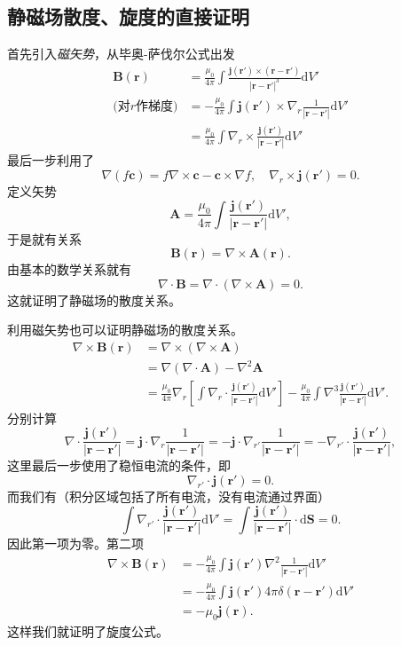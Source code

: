 \documentclass[UTF8]{ctexbook}
\renewcommand{\d}{\mathrm{d}}
\renewcommand{\b}{\boldsymbol}
\numberwithin{equation}{chapter}
\begin{document}
	\subsection{静磁场散度、旋度的直接证明}
	首先引入\emph{磁矢势}，从毕奥-萨伐尔公式出发
	\begin{align*}
		\b{B}(\b{r})&=\frac{\mu_0}{4\pi}\int\frac{\b{j}(\b{r}')\times(\b{r}-\b{r}')}{|\b{r}-\b{r}'|^3}\d V' \\
	\text{(对$r$作梯度)}	&=-\frac{\mu_0}{4\pi}\int\b{j}(\b{r}')\times\nabla_r\frac{1}{|\b{r}-\b{r}'|}\d V' \\	&=\frac{\mu_0}{4\pi}\int\nabla_r\times\frac{\b{j}(\b{r}')}{|\b{r}-\b{r}'|}\d V'
	\end{align*}
	最后一步利用了
	\[\nabla(f\b{c})=f\nabla\times\b{c}-\b{c}\times\nabla f,\quad \nabla_r\times\b{j}(\b{r}')=0.\]
	定义矢势
	\[\b{A}=\frac{\mu_0}{4\pi}\int\frac{\b{j}(\b{r}')}{|\b{r}-\b{r}'|}\d V',\]
	于是就有关系
	\[\b{B}(\b{r})=\nabla\times\b{A}(\b{r}).\]
	由基本的数学关系就有
	\[\nabla\cdot\b{B}=\nabla\cdot(\nabla\times\b{A})=0.\]
	这就证明了静磁场的散度关系。
	
	利用磁矢势也可以证明静磁场的散度关系。
	\begin{align*}
		\nabla\times\b{B}(\b{r})&=\nabla\times(\nabla\times\b{A}) \\ 
		&=\nabla(\nabla\cdot\b{A})-\nabla^2\b{A} \\
		&=\frac{\mu_0}{4\pi}\nabla_r \left[\int\nabla_r\cdot\frac{\b{j}(\b{r}')}{|\b{r}-\b{r}'|}\d V'\right] -\frac{\mu_0}{4\pi}\int\nabla^3\frac{\b{j}(\b{r}')}{|\b{r}-\b{r}'|}\d V'.
	\end{align*}
	分别计算
	\[\nabla\cdot\frac{\b{j}(\b{r}')}{|\b{r}-\b{r}'|}=\b{j}\cdot\nabla_r\frac{1}{|\b{r}-\b{r}'|}=-\b{j}\cdot\nabla_{r'}\frac{1}{|\b{r}-\b{r}'|}=-\nabla_{r'}\cdot\frac{\b{j}(\b{r}')}{|\b{r}-\b{r}'|},\]
	这里最后一步使用了稳恒电流的条件，即
	\[\nabla_{r'}\cdot\b{j}(\b{r}')=0.\]
	而我们有（积分区域包括了所有电流，没有电流通过界面）
	\[\int \nabla_{r'}\cdot\frac{\b{j}(\b{r}')}{|\b{r}-\b{r}'|}\d V'=\int\frac{\b{j}(\b{r}')}{|\b{r}-\b{r}'|}\cdot \d\b{S}=0.\]
	因此第一项为零。第二项
	\begin{align*}
		\nabla\times \b{B}(\b{r})&=-\frac{\mu_0}{4\pi}\int\b{j}(\b{r}')\nabla^2\frac{1}{|\b{r}-\b{r}'|}\d V'\\
		&=-\frac{\mu_0}{4\pi}\int\b{j}(\b{r}')4\pi\delta(\b{r}-\b{r}')\d V'\\
		&=-\mu_0\b{j}(\b{r}).
	\end{align*}
	这样我们就证明了旋度公式。
	
\end{document}
